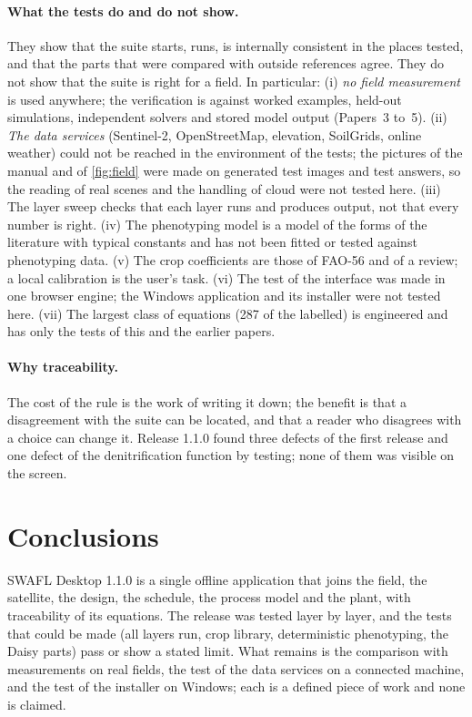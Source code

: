 \paragraph{What the tests do and do not show.} They show that the suite starts, runs, is internally consistent in the places tested, and that the parts that were compared with outside references agree. They do not show that the suite is right for a field. In particular: (i) \emph{no field measurement} is used anywhere; the verification is against worked examples, held-out simulations, independent solvers and stored model output (Papers~3 to~5). (ii) \emph{The data services} (Sentinel-2, OpenStreetMap, elevation, SoilGrids, online weather) could not be reached in the environment of the tests; the pictures of the manual and of \cref{fig:field} were made on generated test images and test answers, so the reading of real scenes and the handling of cloud were not tested here. (iii) The layer sweep checks that each layer runs and produces output, not that every number is right. (iv) The phenotyping model is a model of the forms of the literature with typical constants and has not been fitted or tested against phenotyping data. (v) The crop coefficients are those of FAO-56 and of a review; a local calibration is the user's task. (vi) The test of the interface was made in one browser engine; the Windows application and its installer were not tested here. (vii) The largest class of equations (287 of the labelled) is engineered and has only the tests of this and the earlier papers.

\paragraph{Why traceability.} The cost of the rule is the work of writing it down; the benefit is that a disagreement with the suite can be located, and that a reader who disagrees with a choice can change it. Release 1.1.0 found three defects of the first release and one defect of the denitrification function by testing; none of them was visible on the screen.

\section{Conclusions}
SWAFL Desktop 1.1.0 is a single offline application that joins the field, the satellite, the design, the schedule, the process model and the plant, with traceability of its equations. The release was tested layer by layer, and the tests that could be made (all layers run, crop library, deterministic phenotyping, the Daisy parts) pass or show a stated limit. What remains is the comparison with measurements on real fields, the test of the data services on a connected machine, and the test of the installer on Windows; each is a defined piece of work and none is claimed.

